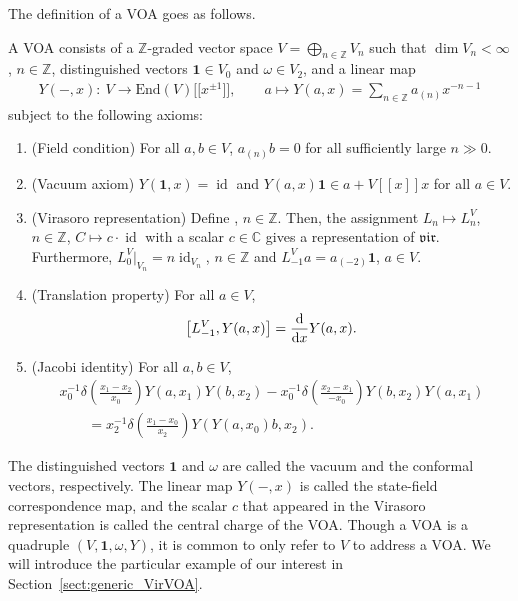 \documentclass[pdftex]{sigma}
\numberwithin{equation}{section}
\newcommand{\End}{\mathrm{End}}
\newcommand{\id}{\operatorname{id}}
\newcommand{\bC}{\mathbb{C}}
\newcommand{\bZ}{\mathbb{Z}}
\newcommand{\voaV}{V}
\newcommand{\voagen}{V}
\newcommand{\voavac}{\mathbf{1}}
\newcommand{\voaY}{Y}
\newcommand{\voaconf}{\omega}
\newcommand{\vir}{\mathfrak{vir}}
\begin{document}
The definition of a VOA goes as follows.
\begin{defn}
A VOA consists of a $\bZ$-graded vector space $\voagen=\bigoplus_{n\in\bZ}\voagen_{n}$ such that $\dim\voagen_{n}<\infty$, $n\in\bZ$,
distinguished vectors $\voavac\in\voagen_{0}$ and $\voaconf\in\voagen_{2}$,
and a linear map
\begin{align*}
	\voaY(-,x)\colon \ \voagen\to \End(\voagen)\big[\big[x^{\pm 1}\big]\big],\qquad
	 a \mapsto \voaY (a,x) = \sum_{n\in \bZ}a_{(n)}x^{-n-1}
\end{align*}
subject to the following axioms:
\begin{enumerate}\itemsep=0pt
\item[(1)] 	(Field condition) For all $a,b\in \voaV$, $a_{(n)}b=0$ for all sufficiently large $n\gg 0$.
\item[(2)] 	(Vacuum axiom) $\voaY(\voavac,x) = \id$ and
$
		\voaY (a,x)\voavac \in a + \voaV [[x]]x
$
	for all $a\in \voaV$.
\item[(3)] 	(Virasoro representation) Define \smash{$L^{\voaV}_{n} = \voaconf_{(n+1)}\in \End(\voaV)$}, $n\in\bZ$. Then, the assignment $L_{n}\mapsto L^{\voaV}_{n}$, $n\in\bZ$, $C\mapsto c\cdot \id$ with a scalar $c\in \bC$
gives a representation of $\vir$.
Furthermore, $L^{\voaV}_{0}|_{\voaV_{n}}=n\id_{\voaV_{n}}$, $n\in\bZ$ and $L^{\voaV}_{-1}a = a_{(-2)}\voavac$, $a\in \voaV$.
\item[(4)] 	(Translation property) For all $a\in \voaV$,
	\begin{align*}
		\big[L_{-1}^{\voaV}, \voaY(a,x)\big] = \frac{\rm d}{{\rm d}x}\voaY(a,x).
	\end{align*}
\item[(5)] 	(Jacobi identity) For all $a,b\in \voaV$,
	\begin{gather*}
 x_{0}^{-1}\delta \left(\frac{x_{1}-x_{2}}{x_{0}}\right)\voaY(a,x_{1})\voaY (b,x_{2})-x_{0}^{-1}\delta\left(\frac{x_{2}-x_{1}}{-x_{0}}\right)\voaY (b,x_{2})\voaY(a,x_{1}) \\
 \qquad = x_{2}^{-1}\delta\left(\frac{x_{1}-x_{0}}{x_{2}}\right)\voaY\left(\voaY(a,x_{0})b,x_{2}\right).
\end{gather*}
\end{enumerate}
\end{defn}

The distinguished vectors $\voavac$ and $\voaconf$ are called the vacuum and the conformal vectors, respectively.
The linear map $\voaY(-,x)$ is called the state-field correspondence map, and
the scalar $c$ that appeared in the Virasoro representation is called the central charge of the VOA.
Though a VOA is a quadruple $(\voaV, \voavac,\voaconf,\voaY)$,
it is common to only refer to $\voaV$ to address a VOA.
We will introduce the particular example of our interest in Section~\ref{sect:generic_VirVOA}.
\end{document}

